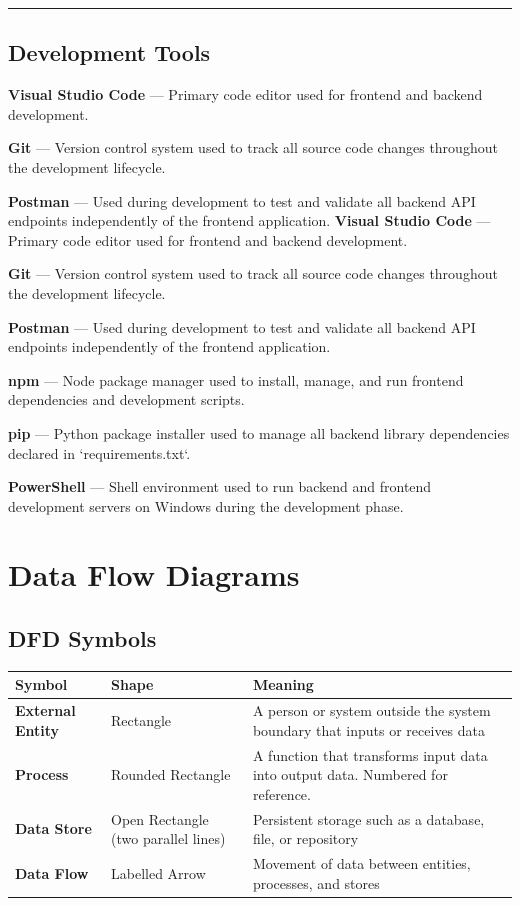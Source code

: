 \documentclass[12pt]{article}
\begin{document}
\noindent\rule{\textwidth}{0.4pt}

\subsection{Development Tools}

\textbf{Visual Studio Code} --- Primary code editor used for frontend and backend development.

\textbf{Git} --- Version control system used to track all source code changes throughout the development lifecycle.

\textbf{Postman} --- Used during development to test and validate all backend API endpoints independently of the frontend application.
\textbf{Visual Studio Code} --- Primary code editor used for frontend and backend development.

\textbf{Git} --- Version control system used to track all source code changes throughout the development lifecycle.

\textbf{Postman} --- Used during development to test and validate all backend API endpoints independently of the frontend application.

\textbf{npm} --- Node package manager used to install, manage, and run frontend dependencies and development scripts.

\textbf{pip} --- Python package installer used to manage all backend library dependencies declared in `requirements.txt`.

\textbf{PowerShell} --- Shell environment used to run backend and frontend development servers on Windows during the development phase.


\clearpage
\section{Data Flow Diagrams}

\subsection{DFD Symbols}


\begin{longtable}{|p{}|p{}|p{}|}
\hline
\textbf{Symbol} & \textbf{Shape} & \textbf{Meaning} \\ \hline
\endhead
\textbf{External Entity} & Rectangle & A person or system outside the system boundary that inputs or receives data \\ \hline
\textbf{Process} & Rounded Rectangle & A function that transforms input data into output data. Numbered for reference. \\ \hline
\textbf{Data Store} & Open Rectangle (two parallel lines) & Persistent storage such as a database, file, or repository \\ \hline
\textbf{Data Flow} & Labelled Arrow & Movement of data between entities, processes, and stores \\ \hline
\end{longtable}
\end{document}
